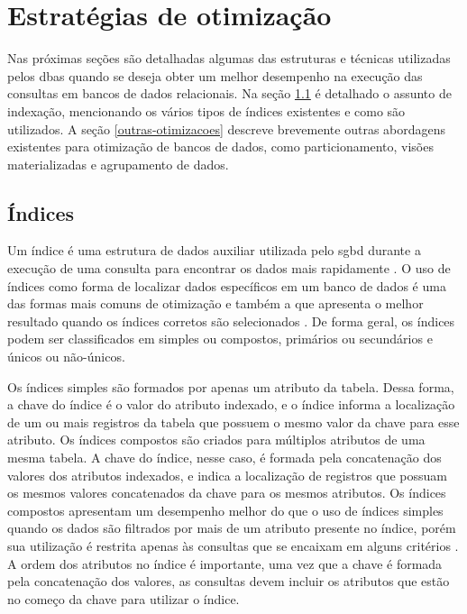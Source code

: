\chapter{Estratégias de otimização}
\label{estrategias-otimizacao}

Nas próximas seções são detalhadas algumas das estruturas e técnicas utilizadas pelos \glspl{dba} quando se deseja obter um melhor desempenho na execução das consultas em bancos de dados relacionais. Na seção \ref{indices} é detalhado o assunto de indexação, mencionando os vários tipos de índices existentes e como são utilizados. A seção \ref{outras-otimizacoes} descreve brevemente outras abordagens existentes para otimização de bancos de dados, como particionamento, visões materializadas e agrupamento de dados.


\section{Índices}
\label{indices}

Um índice é uma estrutura de dados auxiliar utilizada pelo \gls{sgbd} durante a execução de uma consulta para encontrar os dados mais rapidamente \cite[p. 53]{Lightstone:2007}. O uso de índices como forma de localizar dados específicos em um banco de dados é uma das formas mais comuns de otimização e também a que apresenta o melhor resultado quando os índices corretos são selecionados \cite{Petraki:2015}. De forma geral, os índices podem ser classificados em simples ou compostos, primários ou secundários e únicos ou não-únicos.

Os índices simples são formados por apenas um atributo da tabela. Dessa forma, a chave do índice é o valor do atributo indexado, e o índice informa a localização de um ou mais registros da tabela que possuem o mesmo valor da chave para esse atributo. Os índices compostos são criados para múltiplos atributos de uma mesma tabela. A chave do índice, nesse caso, é formada pela concatenação dos valores dos atributos indexados, e indica a localização de registros que possuam os mesmos valores concatenados da chave para os mesmos atributos. Os índices compostos apresentam um desempenho melhor do que o uso de índices simples quando os dados são filtrados por mais de um atributo presente no índice, porém sua utilização é restrita apenas às consultas que se encaixam em alguns critérios \cite[p. 21]{Lightstone:2007}. A ordem dos atributos no índice é importante, uma vez que a chave é formada pela concatenação dos valores, as consultas devem incluir os atributos que estão no começo da chave para utilizar o índice.

